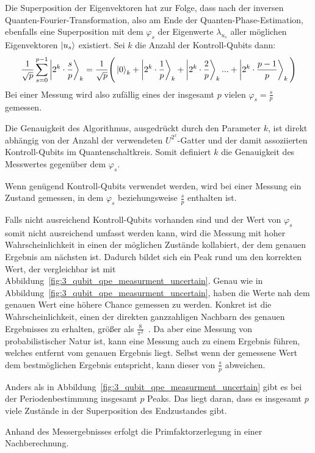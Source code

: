Die Superposition der Eigenvektoren hat zur Folge, 
dass nach der inversen Quanten-Fourier-Transformation, also am Ende der Quanten-Phase-Estimation,
ebenfalls eine Superposition mit dem \(\varphi_s\) der Eigenwerte \(\lambda_{u_s}\) aller möglichen Eigenvektoren \(\ket{u_s}\) existiert.
Sei \(k\) die Anzahl der Kontroll-Qubits dann:
\[
    \frac{1}{\sqrt{p}} \sum_{s=0}^{p-1}\ket{2^k \cdot \frac{s}{p}}_k   = 
    \frac{1}{\sqrt{p}} \Bigg(\ket{0}_k  + \ket{2^k \cdot \frac{1}{p}}_k + \ket{2^k \cdot \frac{2}{p}}_k  ... + \ket{2^k \cdot \frac{p-1}{p}}_k \Bigg)
\]
Bei einer Messung wird also zufällig eines der insgesamt \(p\) vielen \(\varphi_s = \frac{s}{p}\) gemessen.

Die Genauigkeit des Algorithmus, ausgedrückt durch den Parameter \(k\),
ist direkt abhängig von der Anzahl der verwendeten \(U^{2^x}\)-Gatter
und der damit assoziierten Kontroll-Qubits im Quantenschaltkreis.
Somit definiert \(k\) die Genauigkeit des Messwertes gegenüber dem \(\varphi_s\).

Wenn genügend Kontroll-Qubits verwendet werden, 
wird bei einer Messung ein Zustand gemessen, 
in dem \(\varphi_s\) beziehungsweise \(\frac{s}{p}\) enthalten ist.

Falls nicht ausreichend Kontroll-Qubits vorhanden sind 
und der Wert von \(\varphi_s\) somit nicht ausreichend umfasst werden kann,
wird die Messung mit hoher Wahrscheinlichkeit 
in einen der möglichen Zustände kollabiert, 
der dem genauen Ergebnis am nächsten ist.
Dadurch bildet sich ein Peak rund um den korrekten Wert, 
der vergleichbar ist mit Abbildung~\ref{fig:3_qubit_qpe_measurment_uncertain}.
Genau wie in Abbildung~\ref{fig:3_qubit_qpe_measurment_uncertain}, haben die Werte nah dem genauen Wert
eine höhere Chance gemessen zu werden. 
Konkret ist die Wahrscheinlichkeit, 
einen der direkten ganzzahligen Nachbarn des genauen Ergebnisses zu erhalten, 
größer als \(\frac{8}{\pi^2}\)~\cite[119]{kaye2007introduction}.
Da aber eine Messung von probabilistischer Natur ist, 
kann eine Messung auch zu einem Ergebnis führen, 
welches entfernt vom genauen Ergebnis liegt.
Selbst wenn der gemessene Wert dem bestmöglichen Ergebnis entspricht, 
kann dieser von \(\frac{s}{p}\) abweichen. 

Anders als in Abbildung~\ref{fig:3_qubit_qpe_measurment_uncertain} gibt es bei der Periodenbestimmung insgesamt \(p\) Peaks.
Das liegt daran, dass es insgesamt \(p\) viele Zustände in der Superposition des Endzustandes gibt.

Anhand des Messergebnisses erfolgt die Primfaktorzerlegung in einer Nachberechnung.

